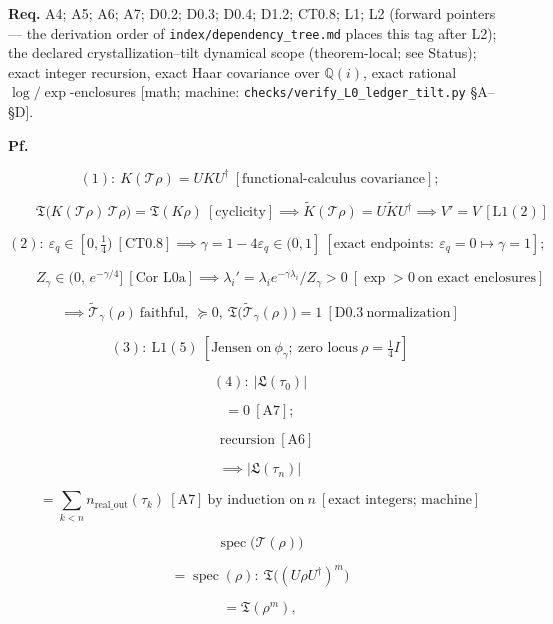 \begin{theorem}
\textbf{Req.} A4; A5; A6; A7; D0.2; D0.3; D0.4; D1.2; CT0.8; L1; L2 (forward pointers — the derivation order of \texttt{index/\allowbreak{}dependency\_\allowbreak{}tree.md} places this tag after L2); the declared crystallization–tilt dynamical scope (theorem-local; see Status); exact integer recursion, exact Haar covariance over $\mathbb Q(i)$, exact rational $\log/\exp$-enclosures [math; machine: \texttt{checks/\allowbreak{}verify\_\allowbreak{}L0\_\allowbreak{}ledger\_\allowbreak{}tilt.py} §A–§D].

\textbf{Pf.}

\[
(1):\ K(\mathcal T\rho)=UKU^\dagger\ [\text{functional-calculus covariance}];
\]

\[
\qquad \mathfrak T\bigl(K(\mathcal T\rho)\,\mathcal T\rho\bigr)=\mathfrak T(K\rho)\ [\text{cyclicity}]\implies\tilde K(\mathcal T\rho)=U\tilde KU^\dagger\implies V'=V\ [\mathrm{L1}(2)]
\]

\[
(2):\ \varepsilon_q\in[0,\tfrac14)\ [\mathrm{CT0.8}]\implies\gamma=1-4\varepsilon_q\in(0,1]\ [\text{exact endpoints}:\ \varepsilon_q=0\mapsto\gamma=1];
\]

\[
\qquad Z_\gamma\in(0,\,e^{-\gamma/4}]\ [\text{Cor L0a}]\implies\lambda_i'=\lambda_ie^{-\gamma\lambda_i}/Z_\gamma>0\ [\exp>0\ \text{on exact enclosures}]
\]

\[
\implies\tilde{\mathcal T}_\gamma(\rho)\ \text{faithful},\ \succeq0,\ \mathfrak T\bigl(\tilde{\mathcal T}_\gamma(\rho)\bigr)=1\ [\mathrm{D0.3}\ \text{normalization}]
\]

\[
(3):\ \mathrm{L1}(5)\ [\text{Jensen on}\ \phi_\gamma;\ \text{zero locus}\ \rho=\tfrac14I]
\]

\[
(4):\ |\mathfrak L(\tau_0)|
\]

\[
= 0\ [\mathrm{A7}];
\]

\[
\quad\text{recursion}\ [\mathrm{A6}]
\]

\[
\implies |\mathfrak L(\tau_n)|
\]

\[
= \textstyle\sum_{k<n}n_{\mathrm{real\_out}}(\tau_k)\ [\mathrm{A7}]\ \text{by induction on}\ n\ [\text{exact integers; machine}]
\]

\[
\operatorname{spec}\bigl(\mathcal T(\rho)\bigr)
\]

\[
= \operatorname{spec}(\rho):\ \mathfrak T\bigl((U\rho U^\dagger)^m\bigr)
\]

\[
= \mathfrak T(\rho^m),
\]


\end{theorem}
